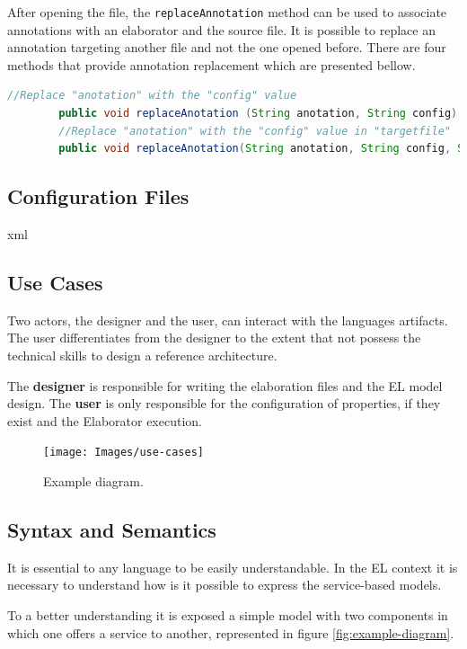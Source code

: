 \documentclass{report}
\begin{document}
		\par After opening the file, the \texttt{replaceAnnotation} method can be used to associate annotations with an elaborator and the source file. It is possible to replace an annotation targeting another file and not the one opened before. There are four methods that provide annotation replacement which are presented bellow.
		
		\begin{lstlisting}[language=Java]
		//Replace "anotation" with the "config" value		
		public void replaceAnotation (String anotation, String config)
		//Replace "anotation" with the "config" value in "targetfile"
		public void replaceAnotation(String anotation, String config, String targetfile)
		\end{lstlisting}
		
		\par 		
		
		\subsection{Configuration Files}
		
		\par xml
		
		\subsection{Use Cases}
		
		\par Two actors, the designer and the user, can interact with the languages artifacts. The user differentiates
		from the designer to the extent that not possess the technical skills to design a reference architecture.
		\par The \textbf{designer} is responsible for writing the elaboration files and the EL model design. The \textbf{user} is only responsible for the configuration of properties, if they exist and the Elaborator execution.
		
		\begin{figure} [H]
			\centering
			\texttt{[image: Images/use-cases]}
			\caption{Example diagram.}
			\label{fig:use-cases}
		\end{figure}
		
		\subsection{Syntax and Semantics}
		
		\par It is essential to any language to be easily understandable. In the EL context it is necessary to understand how is it possible to express the service-based models.
		\par To a better understanding it is exposed a simple model with two components in which one offers a service to another, represented in figure \ref{fig:example-diagram}.
		
\end{document}
